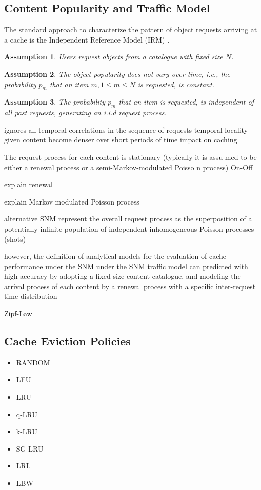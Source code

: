 \subsection{Content Popularity and Traffic Model}
The standard approach to characterize the pattern of object requests arriving at a cache is the Independent Reference Model (IRM) \cite{coffman1973operating}.
\newtheorem{irma}{Assumption}\begin{irma}\label{catalouge}
Users request objects from a catalogue with fixed size $N$.
\end{irma}
\newtheorem{irmb}[irma]{Assumption}\begin{irmb}\label{pmc}
The object popularity does not vary over time, i.e., the probability $p_m$ that an item $m, 1\leq m \leq N$ is requested, is constant.
\end{irmb}
\newtheorem{irmc}[irma]{Assumption}\begin{irmc}\label{iid}
The probability $p_m$ that an item is requested, is independent of all past requests, generating an i.i.d request process.
\end{irmc}

ignores  all  temporal  correlations  in  the  sequence  of  requests
temporal locality
given content become denser over short periods of time
impact on caching

The request
process for each content is stationary (typically it is assu
med to be
either a renewal process or a semi-Markov-modulated Poisso
n process) On-Off

explain renewal

explain Markov modulated Poisson process

alternative SNM
represent the overall request process as the superposition of a potentially infinite population of independent inhomogeneous Poisson processes (shots)

however, the definition of analytical models for the evaluation of cache performance under the SNM
under the SNM traffic model can predicted with high accuracy by adopting a fixed-size content catalogue, and modeling the arrival process of each content by a renewal process with a specific inter-request time distribution


Zipf-Law

\subsection{Cache Eviction Policies}
\begin{itemize}
  \item RANDOM
  \item LFU
  \item LRU
  \item q-LRU
  \item k-LRU
  \item SG-LRU
  \item LRL
  \item LBW
\end{itemize}

